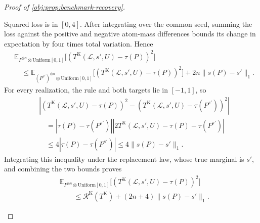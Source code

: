 \begin{proof}[Proof of \cref{obj:prop:benchmark-recovery}]
\begin{enumerate}
Squared loss is in \([0,4]\). After integrating over the common seed, summing the loss against the positive and negative atom-mass differences bounds its change in expectation by four times total variation. Hence
\[
\begin{aligned}
&\mathbb E_{P^{\otimes n}\otimes\mathrm{Uniform}[0,1]}
\bigl[(T^{\mathrm K}(\mathcal L,s',U)-\tau(P))^2\bigr]\\
&\quad\le
\mathbb E_{(P^{s'})^{\otimes n}\otimes\mathrm{Uniform}[0,1]}
\bigl[(T^{\mathrm K}(\mathcal L,s',U)-\tau(P))^2\bigr]
+2n\|s(P)-s'\|_1.
\end{aligned}
\]
For every realization, the rule and both targets lie in \([-1,1]\), so
\[
\begin{aligned}
&\left|
(T^{\mathrm K}(\mathcal L,s',U)-\tau(P))^2
-(T^{\mathrm K}(\mathcal L,s',U)-\tau(P^{s'}))^2
\right|\\
&\quad=
|\tau(P)-\tau(P^{s'})|
\left|2T^{\mathrm K}(\mathcal L,s',U)-\tau(P)-\tau(P^{s'})\right|\\
&\quad\le4|\tau(P)-\tau(P^{s'})|
\le4\|s(P)-s'\|_1.
\end{aligned}
\]
Integrating this inequality under the replacement law, whose true marginal is \(s'\), and combining the two bounds proves
\[
\begin{aligned}
&\mathbb E_{P^{\otimes n}\otimes\mathrm{Uniform}[0,1]}
\bigl[(T^{\mathrm K}(\mathcal L,s',U)-\tau(P))^2\bigr]\\
&\qquad\le
\mathscr R^{\mathrm K}(T^{\mathrm K})
+(2n+4)\|s(P)-s'\|_1.
\end{aligned}
\]


\end{enumerate}
\end{proof}
